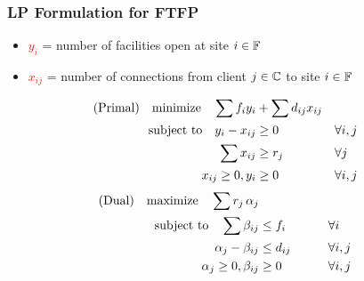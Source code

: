 \documentclass[hyperref,dvipsnames,svgnames,compress]{beamer}
\begin{document}
\begin{frame}
  \frametitle{LP Formulation for FTFP}
  \begin{itemize}
  \item \textcolor{red}{$y_i$} = number of facilities open at site $i\in \mathbb{F}$
  \item \textcolor{red}{$x_{ij}$} = number of connections from client $j\in
    \mathbb{C}$ to site $i \in \mathbb{F}$
  \end{itemize}
  \begin{alignat*}{3}
    \text{(Primal)} \quad\textrm{minimize}\quad \sum f_iy_i &+ \sum d_{ij}x_{ij}&
    \\ \notag
    \textrm{subject to}\quad y_i - x_{ij} &\geq 0  & &\forall i,j
    \\ \notag
    \sum x_{ij} &\geq r_j & &\forall j
    \\ \notag
    x_{ij} \geq 0, y_i &\geq 0 & &\forall i,j
  \end{alignat*}
  \begin{alignat*}{3}
  \text{(Dual)}\quad  \textrm{maximize}\quad \sum r_j\, \alpha_j&
    \\ \notag
    \textrm{subject to} \quad 
      \sum \beta_{ij} &\leq f_i  &\quad\quad			&\forall i
    \\ \notag
    \alpha_{j} - \beta_{ij} 	&\leq  d_{ij}       &                 & \forall i,j
    \\ \notag
    \alpha_j \geq 0, \beta_{ij} &\geq 0           &            & \forall i,j
  \end{alignat*}
\end{frame}

\end{document}
